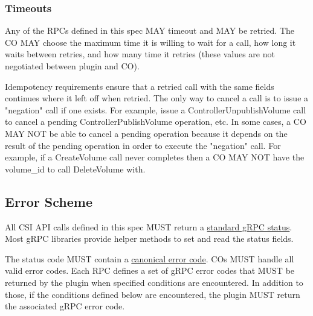 \documentclass[12pt]{article}
\begin{document}
\subsubsection{Timeouts}

Any of the RPCs defined in this spec MAY timeout and MAY be retried. The
CO MAY choose the maximum time it is willing to wait for a call, how
long it waits between retries, and how many time it retries (these
values are not negotiated between plugin and CO).

Idempotency requirements ensure that a retried call with the same fields
continues where it left off when retried. The only way to cancel a call
is to issue a "negation" call if one exists. For example, issue a
ControllerUnpublishVolume call to cancel a pending
ControllerPublishVolume operation, etc. In some cases, a CO MAY NOT be
able to cancel a pending operation because it depends on the result of
the pending operation in order to execute the "negation" call. For
example, if a CreateVolume call never completes then a CO MAY NOT have
the volume\_id to call DeleteVolume with.

\subsection{Error Scheme} \label{sec:error-scheme}

All CSI API calls defined in this spec MUST return a
\href{https://github.com/grpc/grpc/blob/master/src/proto/grpc/status/status.proto}{standard
gRPC status}. Most gRPC libraries provide helper methods to set and read
the status fields.

The status code MUST contain a
\href{https://github.com/grpc/grpc-go/blob/master/codes/codes.go}{canonical
error code}. COs MUST handle all valid error codes. Each RPC defines a
set of gRPC error codes that MUST be returned by the plugin when
specified conditions are encountered. In addition to those, if the
conditions defined below are encountered, the plugin MUST return the
associated gRPC error code.
\end{document}
